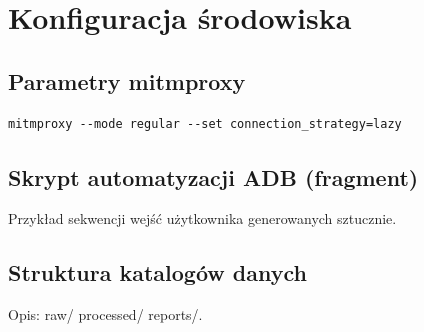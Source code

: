 \chapter{Konfiguracja środowiska}
\section{Parametry mitmproxy}
\begin{verbatim}
mitmproxy --mode regular --set connection_strategy=lazy
\end{verbatim}

\section{Skrypt automatyzacji ADB (fragment)}
Przykład sekwencji wejść użytkownika generowanych sztucznie.

\section{Struktura katalogów danych}
Opis: raw/ processed/ reports/.